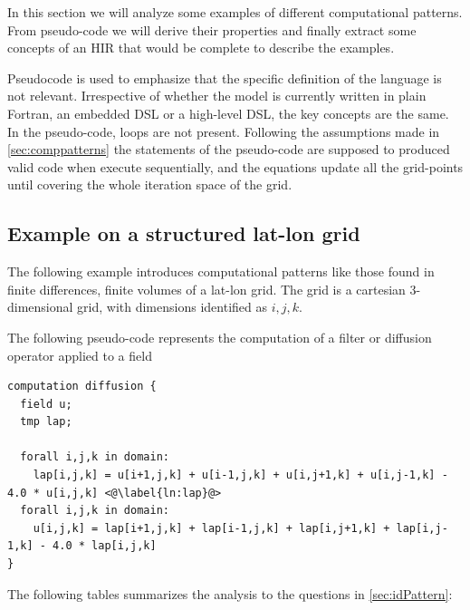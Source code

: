 \documentclass[a4paper,10pt]{scrartcl}
\begin{document}
In this section we will analyze some examples of different computational patterns. From pseudo-code we will derive their properties and finally extract some concepts of an HIR that would be complete to describe the examples.
 
Pseudocode is used to emphasize that the specific definition of the language is not relevant.
Irrespective of whether the model is currently written in plain Fortran, an embedded DSL or a high-level DSL, the key concepts are the same.
In the pseudo-code, loops are not present. Following the assumptions made in \cref{sec:comppatterns} the statements of the pseudo-code are supposed to produced valid code when execute sequentially, and the equations update all the grid-points until covering the whole iteration space of the grid. 

\subsection{Example on a structured lat-lon grid}

The following example introduces computational patterns like those found in finite differences, finite volumes of a lat-lon grid. The grid is a cartesian 3-dimensional grid, with dimensions identified as $i,j,k$.

The following pseudo-code represents the computation of a filter or diffusion operator applied to a field

\begin{lstlisting}[label=lst:diff, caption=pseudo-code for a diffusion operator example]
computation diffusion {
  field u; 
  tmp lap;

  forall i,j,k in domain:
    lap[i,j,k] = u[i+1,j,k] + u[i-1,j,k] + u[i,j+1,k] + u[i,j-1,k] - 4.0 * u[i,j,k] <@\label{ln:lap}@>
  forall i,j,k in domain:
    u[i,j,k] = lap[i+1,j,k] + lap[i-1,j,k] + lap[i,j+1,k] + lap[i,j-1,k] - 4.0 * lap[i,j,k]
}
\end{lstlisting}

The following tables summarizes the analysis to the questions in \cref{sec:idPattern}:
\end{document}
